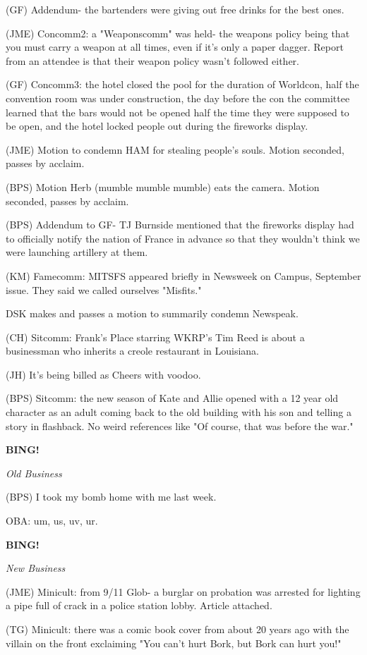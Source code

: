 \documentclass[12pt]{article}
\newcommand{\bing}{{\bf BING!} }
\newcommand{\goto}[1]{\bing \vskip 12pt \centerline{{\em{#1}}}}
\begin{document}
(GF) Addendum- the bartenders were giving out free drinks for the best ones.

(JME) Concomm2: a "Weaponscomm" was held- the weapons policy being that you must carry a weapon at all times, even if it's only a paper dagger. Report from an attendee is that their weapon policy wasn't followed either.

(GF) Concomm3: the hotel closed the pool for the duration of Worldcon, half the convention room was under construction, the day before the con the committee learned that the bars would not be opened half the time they were supposed to be open, and the hotel locked people out during the fireworks display.

(JME) Motion to condemn HAM for stealing people's souls. Motion seconded, passes by acclaim.

(BPS) Motion Herb (mumble mumble mumble) eats the camera. Motion seconded, passes by acclaim.

(BPS) Addendum to GF- TJ Burnside mentioned that the fireworks display had to officially notify the nation of France in advance so that they wouldn't think we were launching artillery at them.

(KM) Famecomm: MITSFS appeared briefly in Newsweek on Campus, September issue. They said we called ourselves "Misfits."

DSK makes and passes a motion to summarily condemn Newspeak.

(CH) Sitcomm: Frank's Place starring WKRP's Tim Reed is about a businessman who inherits a creole restaurant in Louisiana.

(JH) It's being billed as Cheers with voodoo.

(BPS) Sitcomm: the new season of Kate and Allie opened with a 12 year old character as an adult coming back to the old building with his son and telling a story in flashback. No weird references like "Of course, that was before the war."

\goto{Old Business}

(BPS) I took my bomb home with me last week.

OBA: um, us, uv, ur.

\goto{New Business}

(JME) Minicult: from 9/11 Glob- a burglar on probation was arrested for lighting a pipe full of crack in a police station lobby. Article attached.

(TG) Minicult: there was a comic book cover from about 20 years ago with the villain on the front exclaiming "You can't hurt Bork, but Bork can hurt you!"
\end{document}
